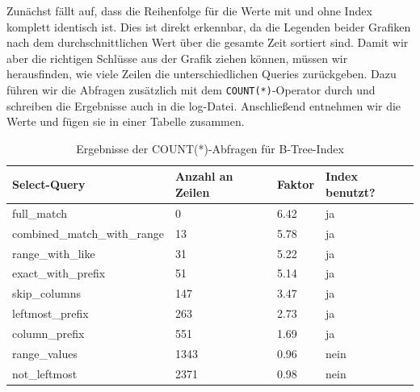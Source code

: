 Zunächst fällt auf, dass die Reihenfolge für die Werte mit und ohne Index komplett identisch ist.
Dies ist direkt erkennbar, da die Legenden beider Grafiken nach dem durchschnittlichen Wert über die gesamte Zeit sortiert sind.
Damit wir aber die richtigen Schlüsse aus der Grafik ziehen können, müssen wir herausfinden, wie viele Zeilen die unterschiedlichen Queries zurückgeben.
Dazu führen wir die Abfragen zusätzlich mit dem \texttt{COUNT(*)}-Operator durch und schreiben die Ergebnisse auch in die log-Datei.
Anschließend entnehmen wir die Werte und fügen sie in einer Tabelle zusammen.

\vspace{-5pt}
\begin{table}[H]
    \centering
    \scriptsize
    \begin{tabular}{|l|l|l|l|}
        \hline
        \textbf{Select-Query} & \textbf{Anzahl an Zeilen} & \textbf{Faktor} & \textbf{Index benutzt?} \\
        \hline
        full\_match & 0 & 6.42 & ja \\
        combined\_match\_with\_range & 13 & 5.78 & ja \\
        range\_with\_like & 31 & 5.22 & ja \\
        exact\_with\_prefix & 51 & 5.14 & ja \\
        skip\_columns & 147 & 3.47 & ja \\
        leftmost\_prefix & 263 & 2.73 & ja \\
        column\_prefix & 551 & 1.69 & ja \\
        range\_values & 1343 & 0.96 & nein \\
        not\_leftmost & 2371 & 0.98 & nein \\
        \hline
    \end{tabular}
    \vspace{3pt}
    \caption{Ergebnisse der COUNT(*)-Abfragen für B-Tree-Index}
    \label{tab:indexing_b_tree_count_results}
\end{table}
\vspace{-25pt}

